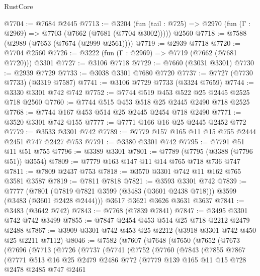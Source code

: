\begin{lexlean}{RustCore}
\begin{coremodule}
@7704 := @7684 @2445
@7713 := @3204
    (fun (tail : @725) => @2970 (fun (Γ : @2969) => @7703 (@7662 (@7681 (@7704 @3002)))))
    @2560
@7718 := @7588 (@2989 (@7653 (@7674 (@2999 @2561))))
@7719 := @2939 @7718
@7720 := @7704 @2560
@7726 := @3222 (fun (Γ : @2969) => @7719 (@7662 (@7681 @7720))) @3301
@7727 := @3106 @7718
@7729 := @7660 (@3031 @3301)
@7730 := @2939 @7729
@7733 := @3038 @3301 @7680 @7720
@7737 := @7727 (@7730 @7733) (@3319 @7587)
@7741 := @3106 @7729 @7733 (@3324 @7659)
@7744 := @3330 @3301 @742 @742
@7752 := @7744 @519 @453 @522 @25 @2445 @2525 @718 @2560
@7760 := @7744 @515 @453 @518 @25 @2445 @2490 @718 @2525
@7768 := @7744 @167 @453 @514 @25 @2445 @2454 @718 @2490
@7771 := @3520 @3301 @742 @155
@7777 := @7771 @166 @16 @25 @2445 @2452 @772
@7779 := @3533 @3301 @742
@7789 := @7779 @157 @165 @11 @15 @755 @2444 @2451 @747 @2427 @753
@7791 := @3380 @3301 @742
@7795 := @7791 @51 @11 @51 @755
@7796 := @3389 @3301
@7801 := @7789 (@7795 (@3388 (@7796 @51)) @3554)
@7809 := @7779 @163 @147 @11 @14 @765 @718 @736 @747
@7811 := @7809 @2437 @753
@7818 := @3570 @3301 @742 @11 @162 @765 @3581 @3587
@7819 := @7811 @7818
@7821 := @3593 @3301 @742
@7839 := @7777
    (@7801 (@7819 @7821 @3599 (@3483 (@3601 @2438 @718))) @3599 (@3483 (@3601 @2428 @2444)))
    @3617
    @3621
    @3626
    @3631
    @3637
@7841 := @3483 (@3642 @742)
@7843 := @7768 (@7839 @7841)
@7847 := @3495 @3301 @742 @742 @3499
@7855 := @7847 @2454 @453 @514 @25 @718 @2212 @2479 @2488
@7867 := @3909 @3301 @742 @453 @25 @2212 (@3918 @3301 @742 @450 @25 @2211 @7112)
@8046 := @7582
    (@7607
      (@7648
        (@7650
          (@7652
            (@7673
              (@7696
                (@7713
                  (@7726
                    (@7737
                      (@7741
                        (@7752
                          (@7760
                            (@7843
                              (@7855
                                @7867
                                (@7771
                                  @513
                                  @16
                                  @25
                                  @2479
                                  @2486
                                  @772
                                  (@7779
                                    @139
                                    @165
                                    @11
                                    @15
                                    @728
                                    @2478
                                    @2485
                                    @747
                                    @2461

\end{coremodule}
\end{lexlean}
